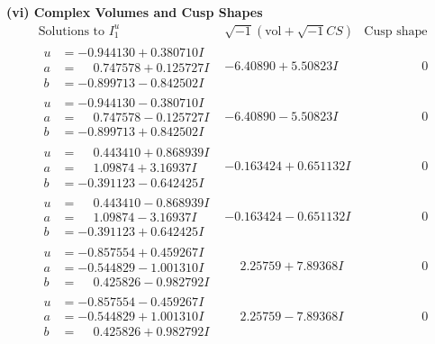 \documentclass[1p]{elsarticle_modified}
\theoremstyle{definition}
\newcommand{\I}{\sqrt{-1}}
\begin{document}
\newpage\flushleft \textbf{(vi) Complex Volumes and Cusp Shapes}
$$\begin{array}{c|c|c}  
\text{Solutions to }I^u_{1}& \I (\text{vol} + \sqrt{-1}CS) & \text{Cusp shape}\\
 \hline 
\begin{aligned}
u &= -0.944130 + 0.380710 I \\
a &= \phantom{-}0.747578 + 0.125727 I \\
b &= -0.899713 - 0.842502 I\end{aligned}
 & -6.40890 + 5.50823 I & \phantom{-0.000000 } 0 \\ \hline\begin{aligned}
u &= -0.944130 - 0.380710 I \\
a &= \phantom{-}0.747578 - 0.125727 I \\
b &= -0.899713 + 0.842502 I\end{aligned}
 & -6.40890 - 5.50823 I & \phantom{-0.000000 } 0 \\ \hline\begin{aligned}
u &= \phantom{-}0.443410 + 0.868939 I \\
a &= \phantom{-}1.09874 + 3.16937 I \\
b &= -0.391123 - 0.642425 I\end{aligned}
 & -0.163424 + 0.651132 I & \phantom{-0.000000 } 0 \\ \hline\begin{aligned}
u &= \phantom{-}0.443410 - 0.868939 I \\
a &= \phantom{-}1.09874 - 3.16937 I \\
b &= -0.391123 + 0.642425 I\end{aligned}
 & -0.163424 - 0.651132 I & \phantom{-0.000000 } 0 \\ \hline\begin{aligned}
u &= -0.857554 + 0.459267 I \\
a &= -0.544829 - 1.001310 I \\
b &= \phantom{-}0.425826 - 0.982792 I\end{aligned}
 & \phantom{-}2.25759 + 7.89368 I & \phantom{-0.000000 } 0 \\ \hline\begin{aligned}
u &= -0.857554 - 0.459267 I \\
a &= -0.544829 + 1.001310 I \\
b &= \phantom{-}0.425826 + 0.982792 I\end{aligned}
 & \phantom{-}2.25759 - 7.89368 I & \phantom{-0.000000 } 0 \\ \hline\begin{aligned}

\end{aligned}
\end{array}$$
\end{document}
